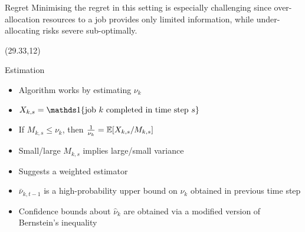 \documentclass[nofooter,scale=1.4]{poster}
\begin{document}
\begin{frame}
\begin{textblock}{25.33}
\begin{block}{Regret}
Minimising the regret in this setting is especially challenging since
over-allocation resources to a job provides only limited information, while under-allocating risks severe sub-optimally.
\end{block}

\end{textblock}

\begin{textblock}{25.33}(29.33,12)
\begin{block}{Estimation}
\begin{itemize}
\item Algorithm works by estimating $\nu_k$ 
\item $X_{k,s} = \ind{\text{job } k \text{ completed in time step } s}$
\item If $M_{k,s} \leq \nu_k$, then ${1 \over \nu_k} = \mathbb E[X_{k,s} / M_{k,s}]$
\item Small/large $M_{k,s}$ implies large/small variance
\item Suggests a weighted estimator
\item $\bar \nu_{k,t-1}$ is a high-probability upper bound on $\nu_k$ obtained in previous time step
\item Confidence bounds about $\hat \nu_k$ are obtained via a modified version of Bernstein's inequality
\end{itemize}
\end{block}


\end{textblock}
\end{frame}
\end{document}
